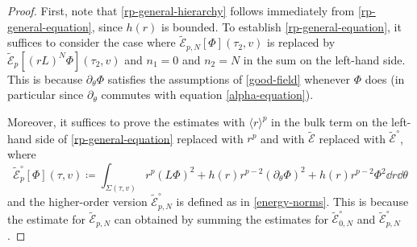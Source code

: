 \documentclass[10pt, reqno]{amsart}
\begin{document}
\begin{proof}
 First, note that \cref{rp-general-hierarchy}
follows immediately from \cref{rp-general-equation}, since \(h(r)\) is bounded. To
establish \cref{rp-general-equation}, it suffices to consider the case where
\(\tilde{\mathcal{E}}_{p,N}[\Phi{}](\tau_2,v)\) is replaced by
\(\tilde{\mathcal{E}}_{p}[(rL)^N\Phi{}](\tau{}_2,v)\) and \(n_1 = 0\) and \(n_2
= N\) in the sum on the left-hand side. This is because \(\partial_\theta{}\Phi{}\)
satisfies the assumptions of \cref{good-field} whenever \(\Phi{}\) does (in
particular since \(\partial_\theta{}\) commutes with equation \cref{alpha-equation}).

Moreover, it suffices to prove the estimates with \(\langle{}r\rangle^p\) in
the bulk term on the left-hand side of \cref{rp-general-equation} replaced with \(r^p\)
and with \(\tilde{\mathcal{E}}\)
replaced with \(\tilde{\mathcal{E}}^{\circ }\),
where
\begin{equation}
\tilde{\mathcal{E}}_p^{\circ }[\Phi{}](\tau{},v) \coloneqq{} \int _{\Sigma{}(\tau{},v)}r^p(L\Phi{})^2 + h(r)r^{p-2}(\partial{}_\theta{}\Phi{})^2 + h(r)r^{p-2}\Phi{}^2\dd{}r\dd{}\theta{}
\end{equation}
and the higher-order version \(\tilde{\mathcal{E}}_{p,N}^{\circ }\) is defined as in
\cref{energy-norms}. This is because the estimate for \(\tilde{\mathcal{E}}_{p,N}\) can
obtained by summing the estimates for \(\tilde{\mathcal{E}}_{0,N}^{\circ }\) and
\(\tilde{\mathcal{E}}_{{p,N}}^{\circ }\).


\end{proof}
\end{document}
